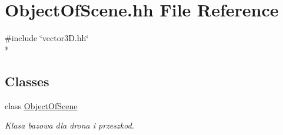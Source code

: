 \hypertarget{_object_of_scene_8hh}{}\section{Object\+Of\+Scene.\+hh File Reference}
\label{_object_of_scene_8hh}
{\ttfamily \#include \char`\"{}vector3\+D.\+hh\char`\"{}}\\*
\subsection*{Classes}
\begin{DoxyCompactItemize}
\item 
class \hyperlink{class_object_of_scene}{Object\+Of\+Scene}
\begin{DoxyCompactList}\small\item\em Klasa bazowa dla drona i przeszkod. \end{DoxyCompactList}\end{DoxyCompactItemize}
